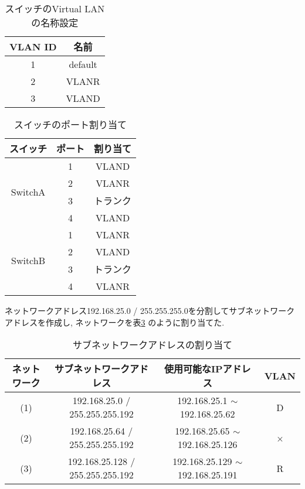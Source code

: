 \documentclass{jsarticle}
\newcommand{\mr}{\multirow}
\begin{document}
\begin{table}[htb]
  \begin{center}
    \caption{スイッチのVirtual LANの名称設定}
    \begin{tabular}{cc} \hline
      VLAN ID & 名前   \\ \hline 
      1 & default   \\
      2 & VLANR    \\
      3 & VLAND    \\ \hline
    \end{tabular}
	\label{tab:switch_vlan3}
  \end{center}
\end{table}

\begin{table}[htb]
  \begin{center}
    \caption{スイッチのポート割り当て}
    \begin{tabular}{ccc} \hline
      スイッチ & ポート & 割り当て   \\ \hline 
      \mr{4}{*}{SwitchA} & 1 & VLAND \\  \cline{2-3}
      & 2 & VLANR  \\ \cline{2-3}
      & 3 & トランク  \\ \cline{2-3}
      & 4 & VLAND  \\ \hline
      \mr{4}{*}{SwitchB} & 1 & VLANR \\  \cline{2-3}
      & 2 & VLAND  \\ \cline{2-3}
      & 3 & トランク  \\ \cline{2-3}
      & 4 & VLANR  \\ \hline
    \end{tabular}
	\label{tab:switch_port3}
  \end{center}
\end{table}


ネットワークアドレス192.168.25.0 / 255.255.255.0を分割してサブネットワークアドレスを作成し, ネットワークを表\ref{tab:subnet_address}
のように割り当てた. 

\begin{table}[htb]
  \begin{center}
    \caption{サブネットワークアドレスの割り当て}
    \begin{tabular}{cccc} \hline
      ネットワーク & サブネットワークアドレス & 使用可能なIPアドレス & VLAN   \\ \hline 
      (1) & 192.168.25.0 / 255.255.255.192 & 192.168.25.1 $\sim$ 192.168.25.62 & D  \\
      (2) & 192.168.25.64 / 255.255.255.192 & 192.168.25.65 $\sim$ 192.168.25.126 & ×   \\
      (3) & 192.168.25.128 / 255.255.255.192 & 192.168.25.129 $\sim$ 192.168.25.191 & R   \\ \hline
    \end{tabular}
	\label{tab:subnet_address}
  \end{center}
\end{table}
\end{document}
